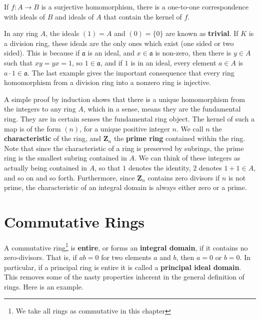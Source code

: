 \begin{theorem}
    If $f:A \to B$ is a surjective homomorphism, there is a one-to-one correspondence with ideals of $B$ and ideals of $A$ that contain the kernel of $f$.
\end{theorem}

\begin{example}
    In any ring $A$, the ideals $(1) = A$ and $(0) = \{ 0 \}$ are known as {\bf trivial}. If $K$ is a division ring, these ideals are the only ones which exist (one sided or two sided). This is because if $\mathfrak{a}$ is an ideal, and $x \in \mathfrak{a}$ is non-zero, then there is $y \in A$ such that $xy = yx = 1$, so $1 \in \mathfrak{a}$, and if $1$ is in an ideal, every element $a \in A$ is $a \cdot 1 \in \mathfrak{a}$. The last example gives the important consequence that every ring homomorphism from a division ring into a nonzero ring is injective.
\end{example}

A simple proof by induction shows that there is a unique homomorphism from the integers to any ring $A$, which in a sense, means they are the fundamental ring. They are in certain senses the fundamental ring object. The kernel of such a map is of the form $(n)$, for a unique positive integer $n$. We call $n$ the {\bf characteristic} of the ring, and $\mathbf{Z}_n$ the {\bf prime ring} contained within the ring. Note that since the characteristic of a ring is preserved by subrings, the prime ring is the smallest subring contained in $A$. We can think of these integers as actually being contained in $A$, so that $1$ denotes the identity, $2$ denotes $1 + 1 \in A$, and so on and so forth. Furthermore, since $\mathbf{Z}_n$ contains zero divisors if $n$ is not prime, the characteristic of an integral domain is always either zero or a prime.

\chapter{Commutative Rings}

A commutative ring\footnote{We take all rings as commutative in this chapter} is {\bf entire}, or forms an {\bf integral domain}, if it contains no zero-divisors. That is, if $ab = 0$ for two elements $a$ and $b$, then $a = 0$ or $b = 0$. In particular, if a principal ring is entire it is called a {\bf principal ideal domain}. This removes some of the nasty properties inherent in the general definition of rings. Here is an example.

